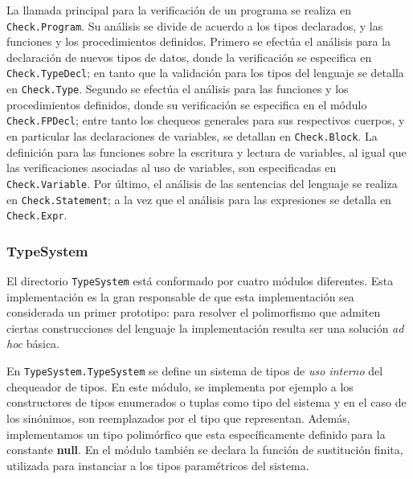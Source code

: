 La llamada principal para la verificación de un programa se realiza en \lstinline[style = module]{Check.Program}.
Su análisis se divide de acuerdo a los tipos declarados, y las funciones y los procedimientos definidos.
Primero se efectúa el análisis para la declaración de nuevos tipos de datos, donde la verificación se especifica en \lstinline[style = module]{Check.TypeDecl}; en tanto que la validación para los tipos del lenguaje se detalla en \lstinline[style = module]{Check.Type}.
Segundo se efectúa el análisis para las funciones y los procedimientos definidos, donde su verificación se especifica en el módulo \lstinline[style = module]{Check.FPDecl}; entre tanto los chequeos generales para sus respectivos cuerpos, y en particular las declaraciones de variables, se detallan en \lstinline[style = module]{Check.Block}.
La definición para las funciones sobre la escritura y lectura de variables, al igual que las verificaciones asociadas al uso de variables, son especificadas en \lstinline[style = module]{Check.Variable}.
Por último, el análisis de las sentencias del lenguaje se realiza en \lstinline[style = module]{Check.Statement}; a la vez que el análisis para las expresiones se detalla en \lstinline[style = module]{Check.Expr}.

\subsubsection{TypeSystem}

El directorio \lstinline[style = module]{TypeSystem} está conformado por cuatro módulos diferentes. Esta implementación es la gran responsable de que esta implementación sea considerada un primer prototipo: para resolver el polimorfismo que admiten ciertas construcciones del lenguaje la implementación resulta ser una solución \textit{ad hoc} básica. %

En \lstinline[style = module]{TypeSystem.TypeSystem} se define un sistema de tipos de \textit{uso interno} del chequeador de tipos. En este módulo, se implementa por ejemplo a los constructores de tipos enumerados o tuplas como tipo del sistema y en el caso de los sinónimos, son reemplazados por el tipo que representan.
Además, implementamos un tipo polimórfico que esta específicamente definido para la constante \textbf{null}.
En el módulo también se declara la función de sustitución finita, utilizada para instanciar a los tipos paramétricos del sistema.


